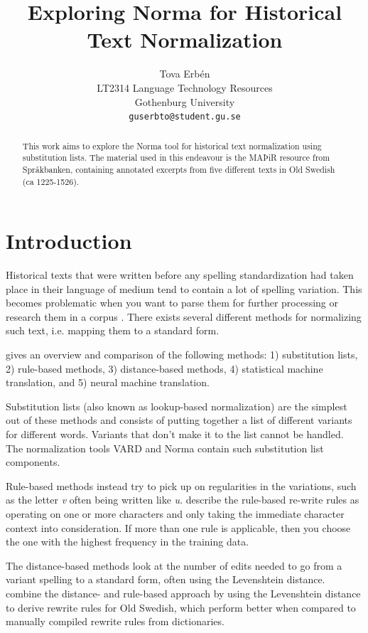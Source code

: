 \documentclass[11pt,a4paper]{article}
\title{Exploring Norma for Historical Text Normalization}
\author{Tova Erbén  \\
  LT2314 Language Technology Resources \\
  Gothenburg University \\
  \texttt{guserbto@student.gu.se} }
\date{}
\begin{document}
\maketitle
\begin{abstract}
This work aims to explore the Norma tool for historical text normalization using substitution lists. The material used in this endeavour is the MAÞiR resource from Språkbanken, containing annotated excerpts from five different texts in Old Swedish (ca 1225-1526).
\end{abstract}

\section{Introduction}

Historical texts that were written before any spelling standardization had taken place in their language of medium tend to contain a lot of spelling variation. This becomes problematic when you want to parse them for further processing or research them in a corpus \citet{abc}. There exists several different methods for normalizing such text, i.e. mapping them to a standard form. 

\citet{bollmann:19} gives an overview and comparison of the following methods: 1) substitution lists, 2) rule-based methods, 3) distance-based methods, 4) statistical machine translation, and 5) neural machine translation. 

Substitution lists (also known as lookup-based normalization) are the simplest out of these methods and consists of putting together a list of different variants for different words. Variants that don't make it to the list cannot be handled. The normalization tools VARD and Norma contain such substitution list components.

Rule-based methods instead try to pick up on regularities in the variations, such as the letter \emph{v} often being written like \emph{u}. \citet{bollmann:12} describe the rule-based re-write rules as operating on one or more characters and only taking the immediate character context into consideration. If more than one rule is applicable, then you choose the one with the highest frequency in the training data.   

The distance-based methods look at the number of edits needed to go from a variant spelling to a standard form, often using the Levenshtein distance. \citet{adesam:12} combine the distance- and rule-based approach by using the Levenshtein distance to derive rewrite rules for Old Swedish, which perform better when compared to manually compiled rewrite rules from dictionaries.
\end{document}
